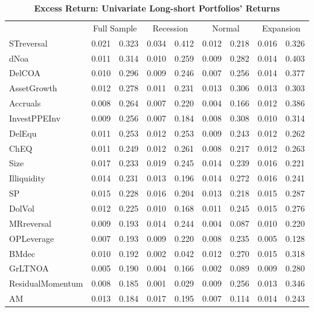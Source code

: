 \begin{table}[H]
  \centering
  \footnotesize
  \caption{\textbf{Excess Return: Univariate Long-short Portfolios' Returns}}
  \label{table: excess univariate ls portfolio}
  \begin{tabular}{lcc|cc|cc|cc}
  \hline
      ~ & \multicolumn{2}{c}{Full Sample} & \multicolumn{2}{c}{Recession} & \multicolumn{2}{c}{Normal} & \multicolumn{2}{c}{Expansion} \\
      STreversal & 0.021 & 0.323 & 0.034 & 0.412 & 0.012 & 0.218 & 0.016 & 0.326 \\ 
      dNoa & 0.011 & 0.314 & 0.010 & 0.259 & 0.009 & 0.282 & 0.014 & 0.403 \\ 
      DelCOA & 0.010 & 0.296 & 0.009 & 0.246 & 0.007 & 0.256 & 0.014 & 0.377 \\ 
      AssetGrowth & 0.012 & 0.278 & 0.011 & 0.231 & 0.013 & 0.306 & 0.013 & 0.303 \\ 
      Accruals & 0.008 & 0.264 & 0.007 & 0.220 & 0.004 & 0.166 & 0.012 & 0.386 \\ 
      InvestPPEInv & 0.009 & 0.256 & 0.007 & 0.184 & 0.008 & 0.308 & 0.010 & 0.314 \\ 
      DelEqu & 0.011 & 0.253 & 0.012 & 0.253 & 0.009 & 0.243 & 0.012 & 0.262 \\ 
      ChEQ & 0.011 & 0.249 & 0.012 & 0.261 & 0.008 & 0.217 & 0.012 & 0.263 \\ 
      Size & 0.017 & 0.233 & 0.019 & 0.245 & 0.014 & 0.239 & 0.016 & 0.221 \\ 
      Illiquidity & 0.014 & 0.231 & 0.013 & 0.196 & 0.014 & 0.272 & 0.016 & 0.241 \\ 
      SP & 0.015 & 0.228 & 0.016 & 0.204 & 0.013 & 0.218 & 0.015 & 0.287 \\ 
      DolVol & 0.012 & 0.225 & 0.010 & 0.168 & 0.011 & 0.245 & 0.015 & 0.276 \\ 
      MRreversal & 0.009 & 0.193 & 0.014 & 0.244 & 0.004 & 0.087 & 0.010 & 0.220 \\ 
      OPLeverage & 0.007 & 0.193 & 0.009 & 0.220 & 0.008 & 0.235 & 0.005 & 0.128 \\ 
      BMdec & 0.010 & 0.192 & 0.002 & 0.042 & 0.012 & 0.270 & 0.015 & 0.318 \\ 
      GrLTNOA & 0.005 & 0.190 & 0.004 & 0.166 & 0.002 & 0.089 & 0.009 & 0.280 \\ 
      ResidualMomentum & 0.008 & 0.185 & 0.001 & 0.029 & 0.009 & 0.256 & 0.013 & 0.346 \\ 
      AM & 0.013 & 0.184 & 0.017 & 0.195 & 0.007 & 0.114 & 0.014 & 0.243 \\ 

\end{tabular}
\end{table}
